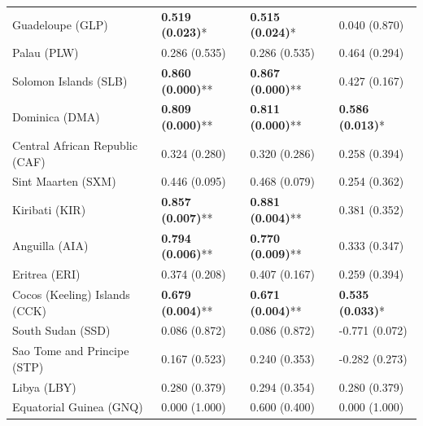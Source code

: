 \begin{longtable}{p{5cm}p{3cm}p{3cm}p{5cm}}
Guadeloupe (GLP) & \textcolor{atlLime600}{\textbf{0.519 (0.023)}*} & \textcolor{atlLime600}{\textbf{0.515 (0.024)}*} & \textcolor{atlOrange600}{0.040 (0.870)} \\
Palau (PLW) & \textcolor{atlOrange600}{0.286 (0.535)} & \textcolor{atlOrange600}{0.286 (0.535)} & \textcolor{atlOrange600}{0.464 (0.294)} \\
Solomon Islands (SLB) & \textcolor{atlLime600}{\textbf{0.860 (0.000)}**} & \textcolor{atlLime600}{\textbf{0.867 (0.000)}**} & \textcolor{atlOrange600}{0.427 (0.167)} \\
Dominica (DMA) & \textcolor{atlLime600}{\textbf{0.809 (0.000)}**} & \textcolor{atlLime600}{\textbf{0.811 (0.000)}**} & \textcolor{atlLime600}{\textbf{0.586 (0.013)}*} \\
Central African Republic (CAF) & \textcolor{atlOrange600}{0.324 (0.280)} & \textcolor{atlOrange600}{0.320 (0.286)} & \textcolor{atlOrange600}{0.258 (0.394)} \\
Sint Maarten (SXM) & \textcolor{atlOrange600}{0.446 (0.095)} & \textcolor{atlOrange600}{0.468 (0.079)} & \textcolor{atlOrange600}{0.254 (0.362)} \\
Kiribati (KIR) & \textcolor{atlLime600}{\textbf{0.857 (0.007)}**} & \textcolor{atlLime600}{\textbf{0.881 (0.004)}**} & \textcolor{atlOrange600}{0.381 (0.352)} \\
Anguilla (AIA) & \textcolor{atlLime600}{\textbf{0.794 (0.006)}**} & \textcolor{atlLime600}{\textbf{0.770 (0.009)}**} & \textcolor{atlOrange600}{0.333 (0.347)} \\
Eritrea (ERI) & \textcolor{atlOrange600}{0.374 (0.208)} & \textcolor{atlOrange600}{0.407 (0.167)} & \textcolor{atlOrange600}{0.259 (0.394)} \\
Cocos (Keeling) Islands (CCK) & \textcolor{atlLime600}{\textbf{0.679 (0.004)}**} & \textcolor{atlLime600}{\textbf{0.671 (0.004)}**} & \textcolor{atlLime600}{\textbf{0.535 (0.033)}*} \\
South Sudan (SSD) & \textcolor{atlOrange600}{0.086 (0.872)} & \textcolor{atlOrange600}{0.086 (0.872)} & \textcolor{atlOrange600}{-0.771 (0.072)} \\
Sao Tome and Principe (STP) & \textcolor{atlOrange600}{0.167 (0.523)} & \textcolor{atlOrange600}{0.240 (0.353)} & \textcolor{atlOrange600}{-0.282 (0.273)} \\
Libya (LBY) & \textcolor{atlOrange600}{0.280 (0.379)} & \textcolor{atlOrange600}{0.294 (0.354)} & \textcolor{atlOrange600}{0.280 (0.379)} \\
Equatorial Guinea (GNQ) & \textcolor{atlOrange600}{0.000 (1.000)} & \textcolor{atlOrange600}{0.600 (0.400)} & \textcolor{atlOrange600}{0.000 (1.000)} \\

\end{longtable}
